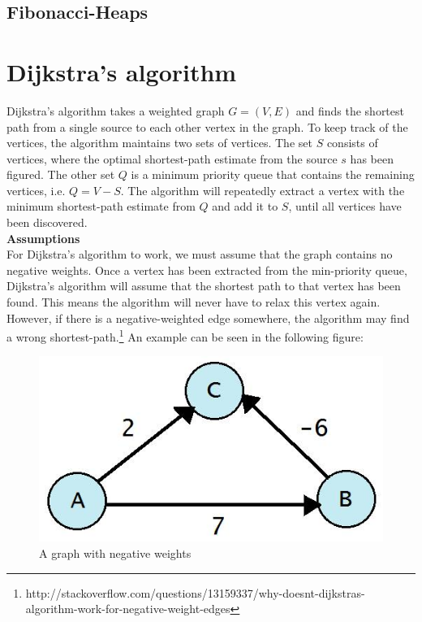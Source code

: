 \documentclass[11pt]{article}
\begin{document}
\subsection{Fibonacci-Heaps}
\newpage
\section{Dijkstra's algorithm}
Dijkstra's algorithm takes a weighted graph $G = (V, E)$ and finds the shortest path from a single source to each other vertex in the graph. To keep track of the vertices, the algorithm maintains two sets of vertices. The set $S$ consists of vertices, where the optimal shortest-path estimate from the source $s$ has been figured. The other set $Q$ is a minimum priority queue that contains the remaining vertices, i.e. $Q = V - S$. The algorithm will repeatedly extract a vertex with the minimum shortest-path estimate from $Q$ and add it to $S$, until all vertices have been discovered.\\

\noindent 
\textbf{Assumptions}\\
For Dijkstra's algorithm to work, we must assume that the graph contains no negative weights. Once a vertex has been extracted from the min-priority queue, Dijkstra's algorithm will assume that the shortest path to that vertex has been found. This means the algorithm will never have to relax this vertex again. However, if there is a negative-weighted edge somewhere, the algorithm may find a wrong shortest-path.\footnote{http://stackoverflow.com/questions/13159337/why-doesnt-dijkstras-algorithm-work-for-negative-weight-edges} An example can be seen in the following figure:\\

\begin{figure}[H]
\centering
\includegraphics[scale=0.3]{neg-weight.png}
\caption{A graph with negative weights}
\end{figure}
\end{document}
